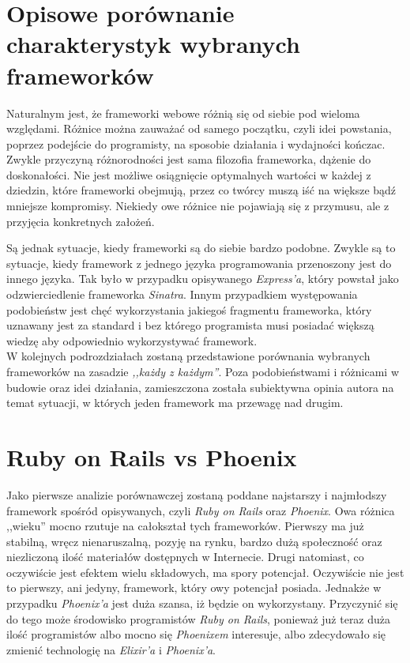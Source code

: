 \documentclass[mgr,oneside]{mgr}
\begin{document}
\section{Opisowe porównanie charakterystyk wybranych frameworków}
Naturalnym jest, że frameworki webowe różnią się od siebie pod wieloma względami. Różnice można zauważać od samego początku, czyli idei powstania, poprzez podejście do programisty, na sposobie działania i wydajności kończac. Zwykle przyczyną różnorodności jest sama filozofia frameworka, dążenie do doskonałości. Nie jest możliwe osiągnięcie optymalnych wartości w każdej z dziedzin, które frameworki obejmują, przez co twórcy muszą iść na większe bądź mniejsze kompromisy. Niekiedy owe różnice nie pojawiają się z przymusu, ale z przyjęcia konkretnych założeń.

Są jednak sytuacje, kiedy frameworki są do siebie bardzo podobne. Zwykle są to sytuacje, kiedy framework z jednego języka programowania przenoszony jest do innego języka. Tak było w przypadku opisywanego \textit{Express'a}, który powstał jako odzwierciedlenie frameworka \textit{Sinatra}. Innym przypadkiem występowania podobieństw jest chęć wykorzystania jakiegoś fragmentu frameworka, który uznawany jest za standard i bez którego programista musi posiadać większą wiedzę aby odpowiednio wykorzystywać framework.\\

W kolejnych podrozdziałach zostaną przedstawione porównania wybranych frameworków na zasadzie \textit{,,każdy z każdym''}. Poza podobieństwami i różnicami w budowie oraz idei działania, zamieszczona została subiektywna opinia autora na temat sytuacji, w których jeden framework ma przewagę nad drugim.

\section{Ruby on Rails vs Phoenix}
Jako pierwsze analizie porównawczej zostaną poddane najstarszy i najmłodszy framework spośród opisywanych, czyli \textit{Ruby on Rails} oraz \textit{Phoenix}. Owa różnica ,,wieku'' mocno rzutuje na całokształ tych frameworków.  Pierwszy ma już stabilną, wręcz nienaruszalną, pozyję na rynku, bardzo dużą społeczność oraz niezliczoną ilość materiałów dostępnych w Internecie.
Drugi natomiast, co oczywiście jest efektem wielu składowych, ma spory potencjał. Oczywiście nie jest to pierwszy, ani jedyny, framework, który owy potencjał posiada. Jednakże w przypadku \textit{Phoenix'a} jest duża szansa, iż będzie on wykorzystany. Przyczynić się do tego może środowisko programistów \textit{Ruby on Rails}, ponieważ już teraz duża ilość programistów albo mocno się \textit{Phoenixem} interesuje, albo zdecydowało się zmienić technologię na \textit{Elixir'a} i \textit{Phoenix'a}.
\end{document}
